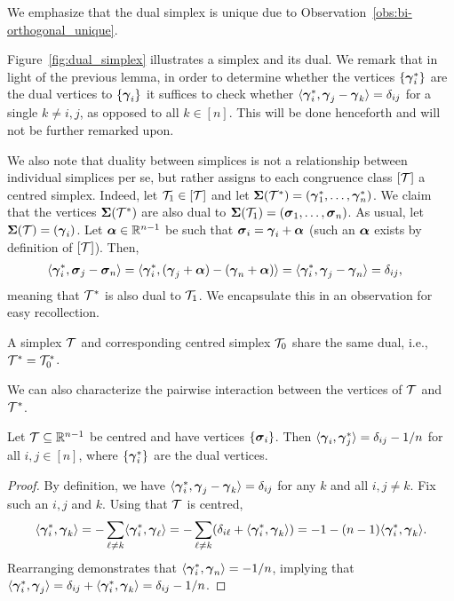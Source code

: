We  emphasize that the dual  simplex is unique due to Observation~\ref{obs:bi-orthogonal_unique}.

Figure~\ref{fig:dual_simplex} illustrates a simplex and its dual. We remark that in light of the previous lemma, in order to determine whether the vertices $\{\vb*{\gamma}^*_i\}$ are the dual vertices to $\{\vb*{\gamma}_i\}$ it suffices to check whether $\langle \vb*{\gamma}^*_i,\vb*{\gamma}_j-\vb*{\gamma}_k\rangle=\delta_{ij}$ for a single $k\neq i,j$, as opposed to all $k\in[n]$. This will be done henceforth and will not be further remarked upon. 

We also note that duality between simplices is not a relationship between individual simplices per se, but rather assigns to each congruence class $[\mathcal{T}]$ a centred simplex. Indeed, let $\mathcal{T}_1\in[\mathcal{T}]$
and  let $\boldsymbol{\Sigma}(\mathcal{T}^*)=(\vb*{\gamma}_1^*,\dots,\vb*{\gamma}_n^*)$. We claim that  the vertices $\boldsymbol{\Sigma}(\mathcal{T}^*)$ are also dual to $\boldsymbol{\Sigma}(\mathcal{T}_1)=(\vb*{\sigma}_1,\dots,\vb*{\sigma}_n)$. As  usual, let $\boldsymbol{\Sigma}(\mathcal{T})=(\vb*{\gamma}_i)$. Let  $\vb*{\alpha}\in\mathbb{R}^{n-1}$  be such that $\vb*{\sigma}_i = \vb*{\gamma}_i + \vb*{\alpha}$ (such an $\vb*{\alpha}$ exists by definition of $[\mathcal{T}]$). Then, 
\begin{align*}
\langle \vb*{\gamma}_i^*,\vb*{\sigma}_j-\vb*{\sigma}_n\rangle &= \langle \vb*{\gamma}_i^*,(\vb*{\gamma}_j+\vb*{\alpha}) - (\vb*{\gamma}_n+\vb*{\alpha})\rangle = \langle \vb*{\gamma}_i^*,\vb*{\gamma}_j-\vb*{\gamma}_n\rangle=\delta_{ij},
\end{align*}
meaning that $\mathcal{T}^*$ is also dual to $\mathcal{T}_1$. We encapsulate this in an observation for easy recollection. 

\begin{observation}
	\label{obs:dual_centred}
	A simplex $\mathcal{T}$ and corresponding centred simplex $\mathcal{T}_0$ share the same dual, i.e., $\mathcal{T}^* = \mathcal{T}_0^*$. 
\end{observation}

We can  also characterize the pairwise interaction between the vertices of $\mathcal{T}$  and $\mathcal{T}^*$. 

\begin{lemma}
	\label{lem:dot_dual_vertices}
	Let $\mathcal{T}\subseteq\mathbb{R}^{n-1}$ be centred and have vertices $\{\vb*{\sigma}_i\}$. Then $\langle \vb*{\gamma}_i,\vb*{\gamma}_j^*\rangle = \delta_{ij}-1/n$ for all $i,j\in[n]$,  where $\{\vb*{\gamma}_i^*\}$ are the dual vertices. 
\end{lemma}
\begin{proof}
	By  definition, we  have $\langle\vb*{\gamma}_i^*,\vb*{\gamma}_j-\vb*{\gamma}_k\rangle=\delta_{ij}$  for any $k$ and  all $i,j\neq k$. Fix such an $i,j$ and $k$. Using  that  $\mathcal{T}$ is centred, 
	\begin{align*}
	\langle \vb*{\gamma}_i^*,\vb*{\gamma}_k\rangle = -\sum_{\ell\neq k}\langle \vb*{\gamma}_i^*,\vb*{\gamma}_\ell\rangle = -\sum_{\ell\neq k} (\delta_{i\ell} +\langle \vb*{\gamma}_i^*,\vb*{\gamma}_k\rangle) = -1 - (n-1)\langle \vb*{\gamma}_i^*,\vb*{\gamma}_k\rangle.
	\end{align*}
	Rearranging demonstrates that   $\langle\vb*{\gamma}_i^*,\vb*{\gamma}_n\rangle=-1/n$,  implying that  $\langle\vb*{\gamma}_i^*,\vb*{\gamma}_j\rangle = \delta_{ij}  + \langle\vb*{\gamma}_i^*,\vb*{\gamma}_k\rangle = \delta_{ij} -1/n$.  
\end{proof}



